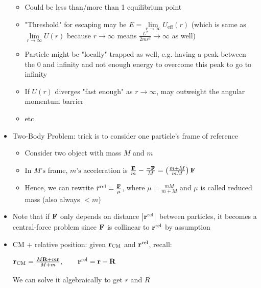 \documentclass[10pt, portrait]{article}
\begin{document}
\begin{multicols*}{2}
\begin{itemize}
    \begin{itemize}
        \item Could be less than/more than 1 equilibrium point
        \item "Threshold" for escaping may be $E = \underset{r \rightarrow \infty}{\lim}U_{\text{eff}}(r)$ (which is same as $\underset{r \rightarrow \infty}{\lim}U(r)$ because $r \rightarrow \infty$ means $\frac{L^2}{2mr^2} \rightarrow \infty$ as well)
        \item Particle might be "locally" trapped as well, e.g. having a peak between the 0 and infinity and not enough energy to overcome this peak to go to infinity
        \item If $U(r)$ diverges "fast enough" as $r \rightarrow \infty$, may outweight the angular momentum barrier
        \item etc
    \end{itemize}
    \item Two-Body Problem: trick is to consider one particle's frame of reference
    \begin{itemize}
        \item Consider two object with mass $M$ and $m$
        \item In $M\text{'s}$ frame, $m\text{'s}$ acceleration is $\frac{\vb{F}}{m} - \frac{-\vb{F}}{M} = \left(\frac{m + M}{mM}\right)\vb{F}$
        \item Hence, we can rewrite $\ddot{r}^{\text{rel}} = \frac{\vb{F}}{\mu}$, where $\mu = \frac{mM}{m + M}$ and $\mu$ is called reduced mass (also always $< m$)
    \end{itemize}
    \item Note that if $\vb{F}$ only depends on distance $\abs{\vb{r}^{\text{rel}}}$ between particles, it becomes a central-force problem since $\vb{F}$ is collinear to $\vb{r}^{\text{rel}}$ by assumption
    \item CM + relative position: given $\vb{r}_{\text{CM}}$ and $\vb{r}^{\text{rel}}$, recall:\\ 
    \begin{center}
        $\vb{r}_{\text{CM}} = \frac{M\vb{R} + m\vb{r}}{M + m}, \qquad \vb{r}^{\text{rel}} = \vb{r} - \vb{R}$
    \end{center}
    We can solve it algebraically to get $r$ and $R$
\end{itemize}



\end{multicols*}
\end{document}
